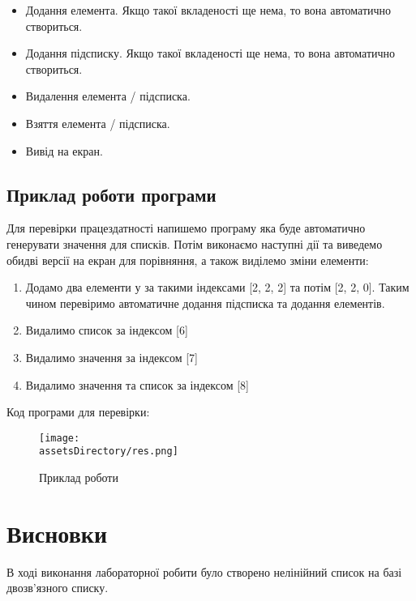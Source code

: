 \begin{itemize}
    \item Додання елемента. Якщо такої вкладеності ще нема, то вона автоматично створиться.
    \item Додання підсписку. Якщо такої вкладеності ще нема, то вона автоматично створиться.
    \item Видалення елемента / підсписка.
    \item Взяття елемента / підсписка.
    \item Вивід на екран.
\end{itemize}




\newpage
\subsection{Приклад роботи програми}
Для перевірки працездатності напишемо програму яка буде автоматично генерувати значення для списків.
Потім виконаємо наступні дії та виведемо обидві версії на екран для порівняння, а також виділемо зміни елементи:

\begin{enumerate}
    \item Додамо два елементи у за такими індексами [2, 2, 2] та потім [2, 2, 0].
    Таким чином перевіримо автоматичне додання підсписка та додання елементів.
    \item Видалимо список за індексом [6]
    \item Видалимо значення за індексом [7]
    \item Видалимо значення та список за індексом [8]
\end{enumerate}


\noindent
Код програми для перевірки:


\begin{figure}[ht!]
    \centering
    \texttt{[image: \\assetsDirectory/res.png]}
    \caption{Приклад роботи}
\end{figure}


\newpage
\section{Висновки}
В ході виконання лабораторної робити було створено нелінійний список на базі двозв'язного списку.
